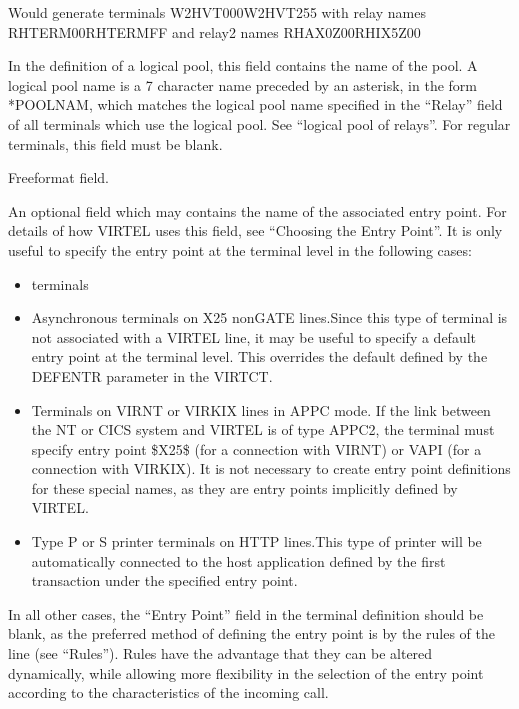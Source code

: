 \documentclass[letterpaper,10pt,english]{sphinxmanual}
\begin{document}
\sphinxAtStartPar
Would generate terminals W2HVT000\sphinxhyphen{}W2HVT255 with relay names RHTERM00\sphinxhyphen{}RHTERMFF and relay2 names RHAX0Z00\sphinxhyphen{}RHIX5Z00
\begin{description}
\sphinxAtStartPar
In the definition of a logical pool, this field contains the name of the pool. A logical pool name is a 7 character name preceded by an asterisk, in the form *POOLNAM, which matches the logical pool name specified in the “Relay” field of all terminals which use the logical pool. See “logical pool of relays”. For regular terminals, this field must be blank.

\sphinxAtStartPar
Free\sphinxhyphen{}format field.

\sphinxAtStartPar
An optional field which may contains the name of the associated entry point. For details of how VIRTEL uses this field, see “Choosing the Entry Point”. It is only useful to specify the entry point at the terminal level in the following cases:
\begin{itemize}
\item {} 
 terminals

\item {} 
\sphinxAtStartPar
Asynchronous terminals on X25 non\sphinxhyphen{}GATE lines.Since this type of terminal is not associated with a VIRTEL line, it may be useful to specify a default entry point at the terminal level. This overrides the default defined by the DEFENTR parameter in the VIRTCT.

\item {} 
\sphinxAtStartPar
Terminals on VIRNT or VIRKIX lines in APPC mode. If the link between the NT or CICS system and VIRTEL is of type APPC2, the terminal must specify entry point \$X25\$ (for a connection with VIRNT) or VAPI (for a connection with VIRKIX). It is not necessary to create entry point definitions for these special names, as they are entry points implicitly defined by VIRTEL.

\item {} 
\sphinxAtStartPar
Type P or S printer terminals on HTTP lines.This type of printer will be automatically connected to the host application defined by the first transaction under the specified entry point.

\end{itemize}

\sphinxAtStartPar
In all other cases, the “Entry Point” field in the terminal definition should be blank, as the preferred method of defining the entry point is by the rules of the line (see “Rules”). Rules have the advantage that they can be
altered dynamically, while allowing more flexibility in the selection of the entry point according to the characteristics of the incoming call.


\end{description}
\end{document}
